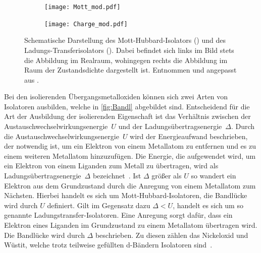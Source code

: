         \begin{figure}
            \centering
            \begin{subfigure}{0.48\textwidth}
                \centering
                \texttt{[image: Mott\_mod.pdf]}
                \subcaption{}
                \label{fig:Mott}
            \end{subfigure}
            \begin{subfigure}{0.48\textwidth}
                \centering
                \texttt{[image: Charge\_mod.pdf]}
                \subcaption{}
                \label{fig:Charge}
            \end{subfigure}
            \caption{Schematische Darstellung des Mott-Hubbard-Isolators () und des Ladungs-Transferisolators ().
            Dabei befindet sich links im Bild stets die Abbildung im Realraum, wohingegen rechts die Abbildung im Raum der Zustandsdichte dargestellt ist.
            Entnommen und angepasst aus \cite{stohr_magnetism_2006}.}
            \label{fig:Bandl}
        \end{figure}
        Bei den isolierenden Übergangsmetalloxiden können sich zwei Arten von Isolatoren ausbilden, welche in \autoref{fig:Bandl} abgebildet sind.
        Entscheidend für die Art der Ausbildung der isolierenden Eigenschaft ist das Verhältnis zwischen der Austauschwechselwirkungsenergie~$U$ und der Ladungsübertragsenergie~$\Delta$.
        Durch die Austauschwechselwirkungsenergie~$U$ wird der Energieaufwand beschrieben, der notwendig ist, um ein Elektron von einem Metallatom zu entfernen und es zu einem weiteren Metallatom hinzuzufügen.
        Die Energie, die aufgewendet wird, um ein Elektron von einem Liganden zum Metall zu übertragen, wird als Ladungsübertragsenergie~$\Delta$ bezeichnet~\cite{stohr_magnetism_2006}.
        Ist $\Delta$ größer als $U$ so wandert ein Elektron aus dem Grundzustand durch die Anregung von einem Metallatom zum Nächsten.
        Hierbei handelt es sich um Mott-Hubbard-Isolatoren, die Bandlücke wird durch $U$ definiert.
        Gilt im Gegensatz dazu $\Delta < U$, handelt es sich um so genannte Ladungstransfer-Isolatoren.
        Eine Anregung sorgt dafür, dass ein Elektron eines Liganden im Grundzustand zu einem Metallatom übertragen wird.
        Die Bandlücke wird durch $\Delta$ beschrieben.
        Zu diesen zählen das Nickeloxid und Wüstit, welche trotz teilweise gefüllten d-Bändern Isolatoren sind~\cite{IF_5}.

